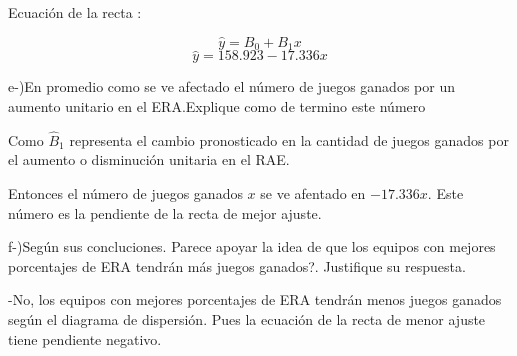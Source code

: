 \documentclass{article}
\begin{document}
		\begin{flushleft}
			Ecuaci\'on de la recta :
		\end{flushleft}
		$$ \hat y = B_{0} + B_{1}x$$
		$$ \hat y = 158.923 - 17.336 x$$

		\begin{flushleft}
			e-)En promedio como se ve afectado el n\'umero de juegos ganados por un aumento unitario en el ERA.Explique como de termino este n\'umero 
		\end{flushleft}

		\begin{flushleft}
			Como $\hat B_{1}$ representa el cambio pronosticado en la cantidad de juegos ganados por el aumento o disminuci\'on unitaria en el RAE.
		\end{flushleft}

		\begin{flushleft}
			Entonces el n\'umero de juegos ganados $x$ se ve afentado en $-17.336 x$. Este n\'umero es la pendiente de la recta de mejor ajuste.
		\end{flushleft}

		\begin{flushleft}
			f-)Seg\'un sus concluciones. \textquestiondown Parece apoyar la idea de que los equipos con mejores porcentajes de ERA tendr\'an m\'as juegos ganados?. Justifique su respuesta. 
		\end{flushleft}

		\begin{flushleft}
			-No, los equipos con mejores porcentajes de ERA tendr\'an menos juegos ganados seg\'un el diagrama de dispersi\'on. Pues la ecuaci\'on de la recta de menor ajuste tiene pendiente negativo.
		\end{flushleft}
\end{document}
